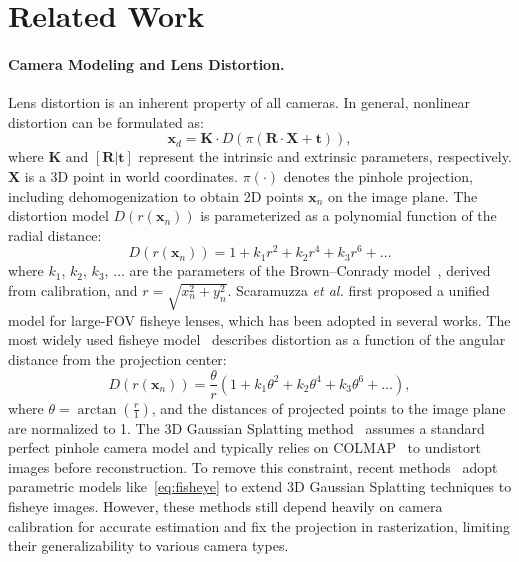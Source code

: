 \section{Related Work}
\label{sec:related_work}
\paragraph{Camera Modeling and Lens Distortion.}
Lens distortion is an inherent property of all cameras. In general, nonlinear distortion can be formulated as:
\begin{equation}
\textbf{x}_d = \textbf{K} \cdot D\left(\pi\left(\textbf{R}\cdot\textbf{X} + \textbf{t}\right)\right),
\end{equation}
where $\textbf{K}$ and $[\textbf{R}|\textbf{t}]$ represent the intrinsic and extrinsic parameters, respectively. $\textbf{X}$ is a 3D point in world coordinates. $\pi(\cdot)$ denotes the pinhole projection, including dehomogenization to obtain 2D points $\textbf{x}_n$ on the image plane. The distortion model $D(r(\textbf{x}_n))$ is parameterized as a polynomial function of the radial distance:
\begin{equation} \label{eq:radial}
D(r(\textbf{x}_n)) = 1 + k_1r^2 + k_2r^4 + k_3r^6 + \ldots
\end{equation}
where $k_1$, $k_2$, $k_3$, $\ldots$ are the parameters of the Brown–Conrady model~\cite{conrady1919decentred,brown1996decentering}, derived from calibration, and $r = \sqrt{x_n^2 + y_n^2}$.
Scaramuzza \textit{et al.}\cite{scaramuzza2006toolbox} first proposed a unified model for large-FOV fisheye lenses, which has been adopted in several works\cite{bujnak2010new,kukelova2015efficient}. The most widely used fisheye model~\cite{itseez2015opencv} describes distortion as a function of the angular distance from the projection center:
\begin{equation} \label{eq:fisheye}
D(r(\textbf{x}_n)) = \frac{\theta}{r} \left(1 + k_1\theta^2 + k_2\theta^4 + k_3\theta^6 + \ldots\right),
\end{equation}
where $\theta = \arctan\left(\frac{r}{1}\right)$, and the distances of projected points to the image plane are normalized to 1.
The 3D Gaussian Splatting method~\cite{kerbl20233d} assumes a standard perfect pinhole camera model and typically relies on COLMAP~\cite{schoenberger2016sfm} to undistort images before reconstruction. To remove this constraint, recent methods~\cite{liao2024fisheye,moenne20243d} adopt parametric models like~\cref{eq:fisheye} to extend 3D Gaussian Splatting techniques to fisheye images. However, these methods still depend heavily on camera calibration for accurate estimation and fix the projection in rasterization, limiting their generalizability to various camera types.
